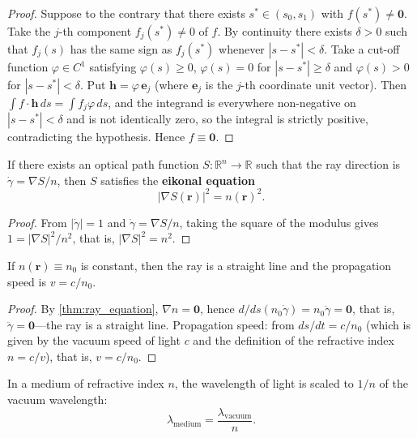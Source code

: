 \begin{proof}
Suppose to the contrary that there exists $s^*\in(s_0,s_1)$ with $f(s^*)\neq\mathbf{0}$. Take the $j$-th component $f_j(s^*)\neq 0$ of $f$. By continuity there exists $\delta>0$ such that $f_j(s)$ has the same sign as $f_j(s^*)$ whenever $|s-s^*|<\delta$. Take a cut-off function $\varphi\in C^1$ satisfying $\varphi(s)\ge 0$, $\varphi(s)=0$ for $|s-s^*|\ge\delta$ and $\varphi(s)>0$ for $|s-s^*|<\delta$. Put $\mathbf{h} = \varphi\,\mathbf{e}_j$ (where $\mathbf{e}_j$ is the $j$-th coordinate unit vector). Then $\int f\cdot\mathbf{h}\,ds = \int f_j\varphi\,ds$, and the integrand is everywhere non-negative on $|s-s^*|<\delta$ and is not identically zero, so the integral is strictly positive, contradicting the hypothesis. Hence $f\equiv\mathbf{0}$.
\end{proof}

\begin{corollary}\label{cor:eikonal_equation}
If there exists an optical path function $S:\mathbb{R}^n\to\mathbb{R}$ such that the ray direction is $\dot\gamma = \nabla S/n$, then $S$ satisfies the \textbf{eikonal equation}
\[
\boxed{\ |\nabla S(\mathbf{r})|^2 = n(\mathbf{r})^2.\ }
\]
\end{corollary}

\begin{proof}
From $|\dot\gamma|=1$ and $\dot\gamma = \nabla S/n$, taking the square of the modulus gives $1 = |\nabla S|^2/n^2$, that is, $|\nabla S|^2 = n^2$.
\end{proof}

\begin{corollary}\label{cor:straight_line_uniform}
If $n(\mathbf{r})\equiv n_0$ is constant, then the ray is a straight line and the propagation speed is $v = c/n_0$.
\end{corollary}

\begin{proof}
By \cref{thm:ray_equation}, $\nabla n = \mathbf{0}$, hence $d/ds(n_0\dot\gamma) = n_0\ddot\gamma = \mathbf{0}$, that is, $\ddot\gamma = \mathbf{0}$---the ray is a straight line. Propagation speed: from $ds/dt = c/n_0$ (which is given by the vacuum speed of light $c$ and the definition of the refractive index $n = c/v$), that is, $v = c/n_0$.
\end{proof}

\begin{proposition}\label{prop:medium_wavelength_scaling}
In a medium of refractive index $n$, the wavelength of light is scaled to $1/n$ of the vacuum wavelength:
\[
\lambda_{\text{medium}} = \frac{\lambda_{\text{vacuum}}}{n}.
\]
\end{proposition}

